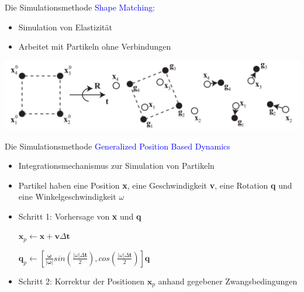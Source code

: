 \documentclass[t]{beamer}
\begin{document}
	\begin{frame}{Die Simulationsmethode}
		\textcolor{blue}{Shape Matching:}
		\begin{itemize}
			\item Simulation von Elastizität
			\item Arbeitet mit Partikeln ohne Verbindungen
		\end{itemize}
		\begin{center}
			\includegraphics[scale = 0.25]{ShapeMatching.png}
		\end{center}
		
	\end{frame}

	
	
	\begin{frame}{Die Simulationsmethode}
		\textcolor{blue}{Generalized Position Based Dynamics}
		\begin{itemize}
			\item Integrationsmechanismus zur Simulation von Partikeln
			\item Partikel haben eine Position \textbf{x}, eine Geschwindigkeit \textbf{v}, eine Rotation \textbf{q} und eine Winkelgeschwindigkeit $\omega$
			\item Schritt 1: Vorhersage von \textbf{x} und \textbf{q}
					\begin{center}
						$\mathbf{x}_p \leftarrow \mathbf{x}+\mathbf{v}\Delta \mathbf{t}$
					\end{center}
					\begin{center}
						$\mathbf{q}_p \leftarrow [\frac{\mathbf{\omega}}{\vert \mathbf{\omega \vert}} sin(\frac{\vert \omega \vert \Delta \mathbf{t}}{2}), cos(\frac{\vert \omega \vert \Delta \mathbf{t}}{2})]\mathbf{q}$
					\end{center}
			\item Schritt 2: Korrektur der Positionen $\mathbf{x}_p$ anhand gegebener Zwangsbedingungen
		\end{itemize}
	\end{frame}
	
\end{document}

